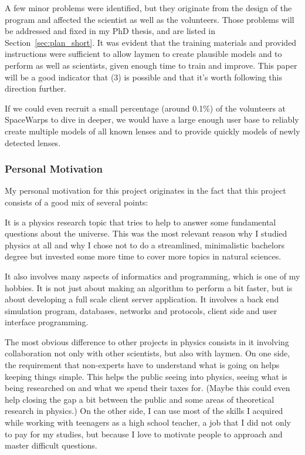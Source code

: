 \documentclass[11pt]{article}
\begin{document}
A few minor problems were identified, but they originate from the design of the program and affected the scientist as well as the volunteers.
Those problems will be addressed and fixed in my PhD thesis, and are listed in Section~\ref{sec:plan_short}.
It was evident that the training materials and provided instructions were sufficient to allow laymen to create plausible models and to perform as well as scientists, given enough time to train and improve.
This paper will be a good indicator that (3) is possible and that it's worth following this direction further.


If we could even recruit a small percentage (around 0.1\%) of the volunteers at SpaceWarps to dive in deeper, we would have a large enough user base to reliably create multiple models of all known lenses and to provide quickly models of newly detected lenses.



\subsubsection{Personal Motivation}

My personal motivation for this project originates in the fact that this project consists of a good mix of several points:

It is a physics research topic that tries to help to answer some fundamental questions about the universe.
This was the most relevant reason why I studied physics at all and why I chose not to do a streamlined, minimalistic bachelors degree but invested some more time to cover more topics in natural sciences.

It also involves many aspects of informatics and programming, which is one of my hobbies.
It is not just about making an algorithm to perform a bit faster, but is about developing a full scale client server application. It involves a back end simulation program, databases, networks and protocols, client side and user interface programming.

The most obvious difference to other projects in physics consists in it involving collaboration not only with other scientists, but also with laymen.
On one side, the requirement that non-experts have to understand what is going on helps keeping things simple.
This helps the public seeing into physics, seeing what is being researched on and what we spend their taxes for.
(Maybe this could even help closing the gap a bit between the public and some areas of theoretical research in physics.)
On the other side, I can use most of the skills I acquired while working with teenagers as a high school teacher, a job that I did not only to pay for my studies, but because I love to motivate people to approach and master difficult questions.
\end{document}
